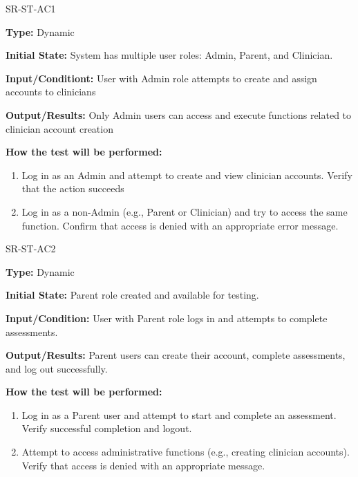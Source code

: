 \documentclass[12pt, titlepage]{article}
\begin{document}
\begin{itemize}
  \begin{item}
      SR-ST-AC1
      \begin{mdframed}[linewidth=0.5mm]
          \textbf{Type:} Dynamic \par
          \textbf{Initial State:} System has multiple user roles: Admin, Parent, and Clinician. \par
          \textbf{Input/Conditiont:}   User with Admin role attempts to create and assign accounts to clinicians \par
          \textbf{Output/Results:}  Only Admin users can access and execute functions related to clinician account creation \par
          \textbf{How the test will be performed:}
          \begin{enumerate}[noitemsep]
            \item Log in as an Admin and attempt to create and view clinician accounts. Verify that the action succeeds
            \item Log in as a non-Admin (e.g., Parent or Clinician) and try to access the same function. Confirm that access is denied with an appropriate error message.
          \end{enumerate}
      \end{mdframed}
  \end{item}

  \begin{item}
    SR-ST-AC2
    \begin{mdframed}[linewidth=0.5mm]
      \textbf{Type:} Dynamic \par
      \textbf{Initial State:} Parent role created and available for testing. \par
      \textbf{Input/Condition:} User with Parent role logs in and attempts to complete assessments. \par
      \textbf{Output/Results:} Parent users can create their account, complete assessments, and log out successfully. \par
      \textbf{How the test will be performed:}
      \begin{enumerate}[noitemsep]
        \item Log in as a Parent user and attempt to start and complete an assessment. Verify successful completion and logout.
        \item Attempt to access administrative functions (e.g., creating clinician accounts). Verify that access is denied with an appropriate message.
      \end{enumerate}
    \end{mdframed}
  

\end{item}
\end{itemize}
\end{document}

